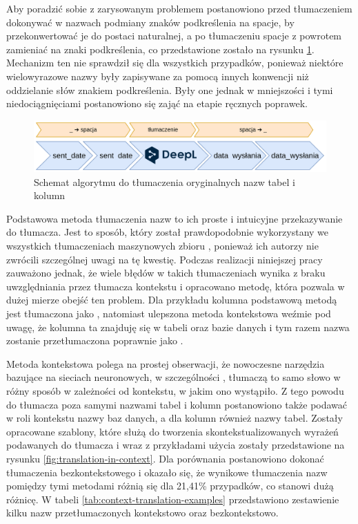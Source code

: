 Aby poradzić sobie z zarysowanym problemem postanowiono przed tłumaczeniem dokonywać w nazwach podmiany znaków podkreślenia na spacje, by przekonwertować je do postaci naturalnej, a po tłumaczeniu spacje z powrotem zamieniać na znaki podkreślenia, co przedstawione zostało na rysunku \ref{fig:multi-word-translation}. Mechanizm ten nie sprawdził się dla wszystkich przypadków, ponieważ niektóre wielowyrazowe nazwy były zapisywane za pomocą innych konwencji niż oddzielanie słów znakiem podkreślenia. Były one jednak w mniejszości i tymi niedociągnięciami postanowiono się zająć na etapie ręcznych poprawek.

\begin{figure}[ht!]
  \centering
  \includegraphics[width=1.0\linewidth]{images/multi_word_translation.png}
  \caption{Schemat algorytmu do tłumaczenia oryginalnych nazw tabel i kolumn}
  \label{fig:multi-word-translation}
\end{figure}

Podstawowa metoda tłumaczenia nazw to ich proste i intuicyjne przekazywanie do tłumacza. Jest to sposób, który został prawdopodobnie wykorzystany we wszystkich tłumaczeniach maszynowych zbioru , ponieważ ich autorzy nie zwrócili szczególnej uwagi na tę kwestię. Podczas realizacji niniejszej pracy zauważono jednak, że wiele błędów w takich tłumaczeniach wynika z braku uwzględniania przez tłumacza kontekstu i opracowano metodę, która pozwala w dużej mierze obejść ten problem. Dla przykładu kolumna  podstawową metodą jest tłumaczona jako , natomiast ulepszona metoda kontekstowa weźmie pod uwagę, że kolumna ta znajduję się w tabeli  oraz bazie danych  i tym razem nazwa zostanie przetłumaczona poprawnie jako .

Metoda kontekstowa polega na prostej obserwacji, że nowoczesne narzędzia bazujące na sieciach neuronowych, w szczególności , tłumaczą to samo słowo w różny sposób w zależności od kontekstu, w jakim ono wystąpiło. Z tego powodu do tłumacza poza samymi nazwami tabel i kolumn postanowiono także podawać w roli kontekstu nazwy baz danych, a dla kolumn również nazwy tabel. Zostały opracowane szablony, które służą do tworzenia skontekstualizowanych wyrażeń podawanych do tłumacza i wraz z przykładami użycia zostały przedstawione na rysunku \ref{fig:translation-in-context}. Dla porównania postanowiono dokonać tłumaczenia bezkontekstowego i okazało się, że wynikowe tłumaczenia nazw pomiędzy tymi metodami różnią się dla 21,41\% przypadków, co stanowi dużą różnicę. W tabeli \ref{tab:context-translation-examples} przedstawiono zestawienie kilku nazw przetłumaczonych kontekstowo oraz bezkontekstowo.

